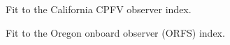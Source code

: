 \documentclass[
]{scrartcl}
\begin{document}
\begin{figure}


\caption{\label{fig-indexfit8}Fit to the California CPFV observer
index.}

\end{figure}%

\begin{figure}


\caption{\label{fig-indexfit9}Fit to the Oregon onboard observer (ORFS)
index.}

\end{figure}%
\end{document}
